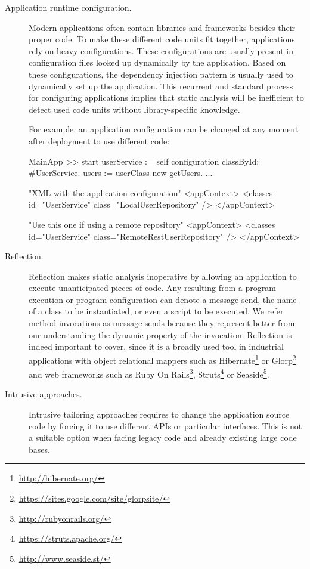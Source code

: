 \begin{description}
\item[Application runtime configuration.] Modern applications often contain libraries and frameworks besides their proper code. 
To make these different code units fit together, applications rely on heavy configurations. 
These configurations are usually present in configuration files looked up dynamically by the application. 
Based on these configurations, the dependency injection pattern is usually used to dynamically set up the application. 
This recurrent and standard process for configuring applications implies that static analysis will be inefficient to detect used code units without library-specific knowledge.

For example, an application configuration can be changed at any moment after deployment to use different code:

\begin{code}
MainApp >> start
    userService := self configuration classById: #UserService.
    users := userClass new getUsers.
    ...

"XML with the application configuration"
<appContext>
    <classes id="UserService" class="LocalUserRepository" />
</appContext>

"Use this one if using a remote repository"   
<appContext>
    <classes id="UserService" class="RemoteRestUserRepository" />
</appContext>
\end{code}

\item[Reflection.] Reflection makes static analysis inoperative by allowing an application to execute unanticipated pieces of code. 
Any  resulting from a program execution or program configuration can denote a message send, the name of a class to be instantiated, or even a script to be executed. We refer method invocations as message sends because they represent better from our understanding the dynamic property of the invocation. Reflection is indeed important to cover, since it is a broadly used tool in industrial applications with object relational mappers such as Hibernate\footnote{\url{http://hibernate.org/}} or Glorp\footnote{\url{https://sites.google.com/site/glorpsite/}} and web frameworks such as Ruby On Rails\footnote{\url{http://rubyonrails.org/}}, Struts\footnote{\url{https://struts.apache.org/}} or Seaside\footnote{\url{http://www.seaside.st/}}.

\item[Intrusive approaches.] Intrusive tailoring approaches requires to change the application source code by forcing it to use different APIs or particular interfaces. This is not a suitable option when facing legacy code and already existing large code bases.

\end{description}

